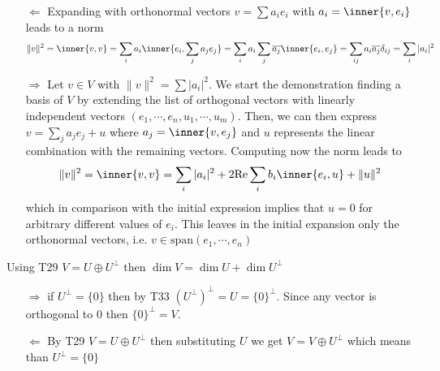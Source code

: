 \exo{}

\exo{} \begin{itemize}

\item[$\Leftarrow$] Expanding with orthonormal vectors $v=\sum a_i e_i$ with $a_i=\inner{v,e_i}$ leads to a norm 
\begin{align*}
\|v\|^2 = \inner{v,v} = \sum\limits_i a_i \inner{e_i, \sum\limits_j a_je_j}=\sum\limits_i a_i \sum\limits_j \overline{a_j} \inner{e_i,e_j} = \sum\limits_{ij} a_i \overline{a_j} \delta_{ij}= \sum\limits_i |a_i|^2
\end{align*}

\item[$\Rightarrow$] Let $v\in V$ with $\|v\|^2=\sum |a_i|^2$. 
We start the demonstration finding a basis of $V$ by extending the list of orthogonal vectors with linearly independent vectors $(e_1, \cdots, e_n, u_1, \cdots , u_m)$. Then, we can then express $v=\sum\limits_ja_je_j + u$ where $a_j=\inner{v,e_j}$ and $u$ represents the linear combination with the remaining vectors. Computing now the norm leads to
\begin{align*}
\|v\|^2 = \inner{v,v} = \sum\limits_i |a_i|^2 + 2\mathrm{Re}\sum\limits_ib_i\inner{e_i, u} +\|u\|^2
\end{align*}
which in comparison with the initial expression implies that $u=0$ for arbitrary different values of $e_i$. This leaves in the initial expansion only the orthonormal vectors, i.e. $v\in\mathrm{span}(e_1,\cdots,e_n)$
\end{itemize}
\exo{}

\exo{} Using T29 $V = U\oplus U^\perp$ then $\dim{V} =  \dim{U} + \dim{U^\perp} $

\exo{}
\begin{itemize}
\item[$\Rightarrow$] if $U^\perp = \{0\}$ then by T33 $(U^\perp)^\perp = U =\{0\}^\perp$. Since any vector is orthogonal to $0$ then $\{0\}^\perp= V$.
\item[$\Leftarrow$] By T29 $V = U \oplus U^\perp$ then substituting $U$ we get  
$V = V \oplus U^\perp$ which means than  $U^\perp=\{0\}$
\end{itemize}


